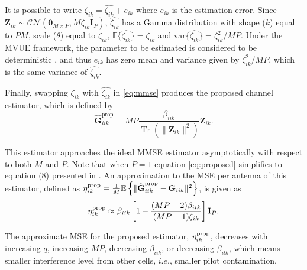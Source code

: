 \documentclass[journal,12pt,onecolumn]{IEEEtran}
\DeclareMathOperator{\Tr}{Tr}
\begin{document}
It is possible to write $\zeta_{ik} = \hat{\zeta_{ik}} + e_{ik}$ where $e_{ik}$ is the estimation error. Since $\textbf{Z}_{ik} \sim \mathcal{CN}(\textbf{0}_{M \times P},M\zeta_{ik}\textbf{I}_{P})$, $ \hat{\zeta_{ik}}$ has a Gamma distribution with shape ($k$) equal to $PM$, scale ($\theta$) equal to $\zeta_{ik}$, $ \mathbb{E} \{ \hat{\zeta_{ik}} \} = \zeta_{ik}$ and $\text{var}\{ \hat{\zeta_{ik}} \} = \zeta_{ik}^{2}/MP$. Under the MVUE framework, the parameter to be estimated is considered to be deterministic \cite{kay:estimationbook}, and thus $e_{ik}$ has zero mean and variance given by $\zeta_{ik}^{2}/MP$, which is the same variance of $\hat{\zeta_{ik}}$.

Finally, swapping $\zeta_{ik}$ with $\hat{\zeta_{ik}}$ in \eqref{eq:mmse} produces the proposed channel estimator, which is defined by
\begin{equation}\label{eq:proposed}
\hat{\textbf{G}}_{iik}^{\text{prop}} = MP \frac{\beta_{iik}}{ \Tr \left( \lVert \textbf{Z}_{ik} \rVert^{2} \right) }\textbf{Z}_{ik}.
\end{equation}

This estimator approaches the ideal MMSE estimator asymptotically with respect to both $M$ and $P$. Note that when $P = 1$ equation \eqref{eq:proposed} simplifies to equation (8) presented in \cite{Amin:channelEstPilotCont}. An approximation to the MSE per antenna of this estimator, defined as $\eta_{ik}^{\text{\text{prop}}} = \frac{1}{M} \mathbb{E} \left\lbrace \lVert  \hat{\textbf{G}}_{iik}^{\text{prop}} - \textbf{G}_{iik} \rVert^{2} \right\rbrace$, is given as
\begin{equation}\label{eq:mse_prop}
\eta_{ik}^{\text{\text{prop}}} \approx \beta_{iik}  \left[  1 - \frac{(MP-2)\beta_{iik}}{(MP-1)\zeta_{ik}} \right] \textbf{I}_{P}.
\end{equation}

The approximate MSE for the proposed estimator, $\eta_{ik}^{\text{\text{prop}}}$, decreases with increasing $q$, increasing $MP$, decreasing $\beta_{iik}$, or decreasing $\beta_{ilk}$, which means smaller interference level from other cells, $i.e.$, smaller pilot contamination.
\end{document}

